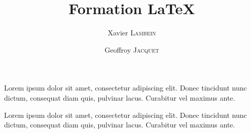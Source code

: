 \documentclass{report}
\title{\textbf{Formation \LaTeX}}
\author{Xavier \textsc{Lambein}
    \and Geoffroy \textsc{Jacquet}}
\begin{document}
\maketitle
 
\newpage
\small
Lorem ipsum dolor sit amet, consectetur adipiscing elit. Donec tincidunt nunc dictum, consequat diam quis, pulvinar lacus. Curabitur vel maximus ante. 

Lorem ipsum dolor sit amet, consectetur adipiscing elit. Donec tincidunt nunc dictum, consequat diam quis, pulvinar lacus. Curabitur vel maximus ante. 
\end{document}
